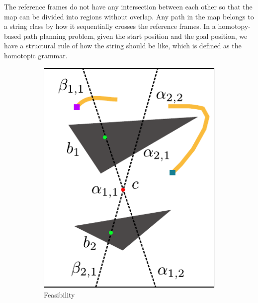 \documentclass[letterpaper, 10 pt, conference]{ieeeconf}
\begin{document}
The reference frames do not have any intersection between each other so that the map can be divided into regions without overlap.
Any path in the map belongs to a string class by how it sequentially crosses the reference frames.
In a homotopy-based path planning problem, given the start position and the goal position, we have a structural rule of how the string should be like, which is defined as the homotopic grammar.


\begin{figure}
	\centering
	\begin{subfigure}[t]{0.4\linewidth}
		\centering
		\includegraphics[width=\textwidth]{fig/feasibility}
		\caption{Feasibility}
		\label{fig:grammar:feasibility}
	\end{subfigure}  
	\begin{subfigure}[t]{0.4\linewidth}
		\centering

\end{subfigure}
\end{figure}
\end{document}
